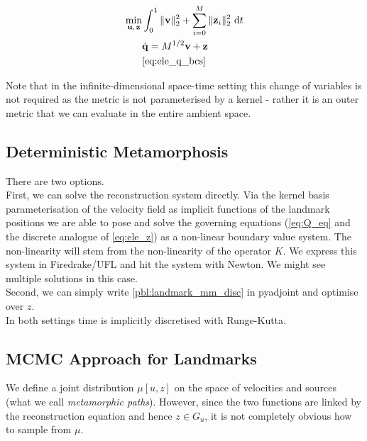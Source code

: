 \documentclass{article}
\newcommand{\norm}[2]{\| #1 \|_{ #2 }}
\newcommand{\ltwonorm}[1]{\norm{ #1 }{2}}
\newcommand{\diff}[1]{\text{d} #1}
\newcommand{\Q}{\mathbf{q}}
\newcommand{\U}{\mathbf{u}}
\newcommand{\Z}{\mathbf{z}}
\newcommand{\V}{\mathbf{v}}
\begin{document}
\begin{subequations}\label{pbl:landmark_mm_disc_matrix}
\begin{align}
\min_{\U,\, \Z} & \int_0^1 \ltwonorm{\V}^2 + \sum_{i=0}^M \ltwonorm{\Z_i}^2 \diff{t}\\
            & \dot{\Q} = M^{1/2} \V + \Z\label{eq:Q_eq}\\
            & \eqref{eq:ele_q_bcs}\nonumber
\end{align}
\end{subequations}

Note that in the infinite-dimensional space-time setting this change of
variables is not required as the metric is not parameterised by a kernel -
rather it is an outer metric that we can evaluate in the entire ambient space.\\

\subsection{Deterministic Metamorphosis}

There are two options.\\

First, we can solve the reconstruction system directly. Via the kernel basis
parameterisation of the velocity field as implicit functions of the landmark
positions we are able to pose and solve the governing equations (\eqref{eq:Q_eq}
and the discrete analogue of \eqref{eq:ele_z}) as a non-linear boundary value
system. The non-linearity will stem from the non-linearity of the operator $K$.
We express this system in Firedrake/UFL and hit the system with Newton. We might
see multiple solutions in this case.\\

Second, we can simply write \eqref{pbl:landmark_mm_disc} in pyadjoint and optimise
over $z$.\\

In both settings time is implicitly discretised with Runge-Kutta.

\subsection{MCMC Approach for Landmarks}

We define a joint distribution $\mu[u,z]$ on the space of velocities and sources
(what we call \textit{metamorphic paths}). However, since the two functions are
linked by the reconstruction equation and hence $z \in G_u$, it is not
completely obvious how to sample from $\mu$.
\end{document}
